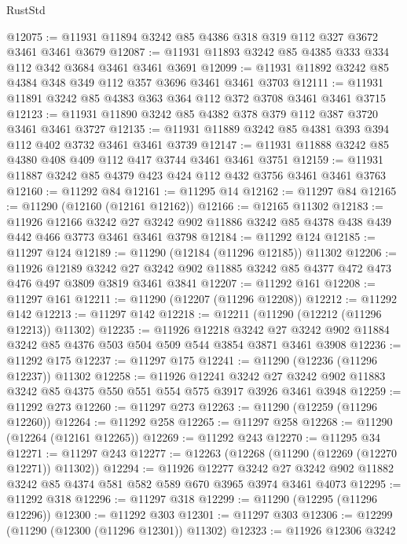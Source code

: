 \begin{lexlean}{RustStd}
\begin{coremodule}
@12075 := @11931 @11894 @3242 @85 @4386 @318 @319 @112 @327 @3672 @3461 @3461 @3679
@12087 := @11931 @11893 @3242 @85 @4385 @333 @334 @112 @342 @3684 @3461 @3461 @3691
@12099 := @11931 @11892 @3242 @85 @4384 @348 @349 @112 @357 @3696 @3461 @3461 @3703
@12111 := @11931 @11891 @3242 @85 @4383 @363 @364 @112 @372 @3708 @3461 @3461 @3715
@12123 := @11931 @11890 @3242 @85 @4382 @378 @379 @112 @387 @3720 @3461 @3461 @3727
@12135 := @11931 @11889 @3242 @85 @4381 @393 @394 @112 @402 @3732 @3461 @3461 @3739
@12147 := @11931 @11888 @3242 @85 @4380 @408 @409 @112 @417 @3744 @3461 @3461 @3751
@12159 := @11931 @11887 @3242 @85 @4379 @423 @424 @112 @432 @3756 @3461 @3461 @3763
@12160 := @11292 @84
@12161 := @11295 @14
@12162 := @11297 @84
@12165 := @11290 (@12160 (@12161 @12162))
@12166 := @12165 @11302
@12183 := @11926
    @12166
    @3242
    @27
    @3242
    @902
    @11886
    @3242
    @85
    @4378
    @438
    @439
    @442
    @466
    @3773
    @3461
    @3461
    @3798
@12184 := @11292 @124
@12185 := @11297 @124
@12189 := @11290 (@12184 (@11296 @12185)) @11302
@12206 := @11926
    @12189
    @3242
    @27
    @3242
    @902
    @11885
    @3242
    @85
    @4377
    @472
    @473
    @476
    @497
    @3809
    @3819
    @3461
    @3841
@12207 := @11292 @161
@12208 := @11297 @161
@12211 := @11290 (@12207 (@11296 @12208))
@12212 := @11292 @142
@12213 := @11297 @142
@12218 := @12211 (@11290 (@12212 (@11296 @12213)) @11302)
@12235 := @11926
    @12218
    @3242
    @27
    @3242
    @902
    @11884
    @3242
    @85
    @4376
    @503
    @504
    @509
    @544
    @3854
    @3871
    @3461
    @3908
@12236 := @11292 @175
@12237 := @11297 @175
@12241 := @11290 (@12236 (@11296 @12237)) @11302
@12258 := @11926
    @12241
    @3242
    @27
    @3242
    @902
    @11883
    @3242
    @85
    @4375
    @550
    @551
    @554
    @575
    @3917
    @3926
    @3461
    @3948
@12259 := @11292 @273
@12260 := @11297 @273
@12263 := @11290 (@12259 (@11296 @12260))
@12264 := @11292 @258
@12265 := @11297 @258
@12268 := @11290 (@12264 (@12161 @12265))
@12269 := @11292 @243
@12270 := @11295 @34
@12271 := @11297 @243
@12277 := @12263 (@12268 (@11290 (@12269 (@12270 @12271)) @11302))
@12294 := @11926
    @12277
    @3242
    @27
    @3242
    @902
    @11882
    @3242
    @85
    @4374
    @581
    @582
    @589
    @670
    @3965
    @3974
    @3461
    @4073
@12295 := @11292 @318
@12296 := @11297 @318
@12299 := @11290 (@12295 (@11296 @12296))
@12300 := @11292 @303
@12301 := @11297 @303
@12306 := @12299 (@11290 (@12300 (@11296 @12301)) @11302)
@12323 := @11926
    @12306
    @3242

\end{coremodule}
\end{lexlean}
